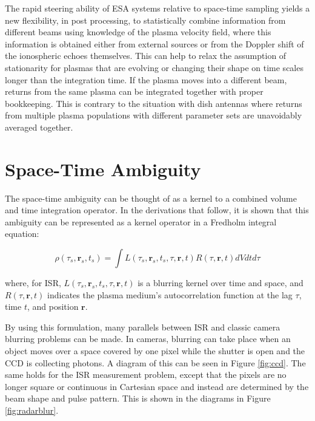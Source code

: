 The rapid steering ability of ESA systems relative to space-time sampling yields a new flexibility, in post processing, to statistically combine information from different beams using knowledge of the plasma velocity field, where this information is obtained either from external sources or from the Doppler shift of the ionospheric echoes themselves. This can help to relax the assumption of stationarity for plasmas that are evolving or changing their shape on time scales longer than the integration time. If the plasma moves into a different beam, returns from the same plasma can be integrated together with proper bookkeeping. This is contrary to the situation with dish antennas where returns from multiple plasma populations with different parameter sets are unavoidably averaged together.


\section{Space-Time Ambiguity}
\label{sec:sptimeamb}

The space-time ambiguity can be thought of as a kernel to a combined volume and time integration operator. In the derivations that follow, it is shown that this ambiguity can be represented as a kernel operator in a Fredholm integral equation:

\begin{equation}
\label{eqn:friedholm}
\rho(\tau_s ,\mathbf{r}_{s},t_s) = \int L(\tau_s, \mathbf{r}_{s},t_s,\tau,\mathbf{r},t) R(\tau,\mathbf{r},t) dVd t d\tau
\end{equation}

\noindent where, for ISR, $L(\tau_s, \mathbf{r}_{s},t_s,\tau,\mathbf{r},t) $ is a blurring kernel over time and space, and $R(\tau,\mathbf{r},t) $ indicates the plasma medium's autocorrelation function at the lag $\tau$, time $t$, and position $\mathbf{r}$.

By using this formulation, many parallels between ISR and classic camera blurring problems can be made. In cameras, blurring can take place when an object moves over a space covered by one pixel while the shutter is open and the CCD is collecting photons. A diagram of this can be seen in Figure \ref{fig:ccd}. The same holds for the ISR measurement problem, except that the pixels are no longer square or continuous in Cartesian space and instead are determined by the beam shape and pulse pattern. This is shown in the diagrams in Figure \ref{fig:radarblur}.


